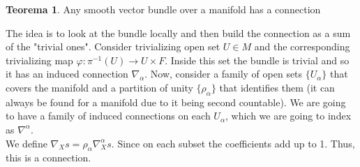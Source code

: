 \documentclass[12pt,a4paper]{report}
\theoremstyle{definition}
\theoremstyle{Theorem}
\newtheorem{Theo}[Def]{Teorema}
\theoremstyle{definition}
\theoremstyle{definition}
\theoremstyle{definition}
\begin{document}
	\begin{Theo}
		Any smooth vector bundle over a manifold has a connection
	\end{Theo}
	The idea is to look at the bundle locally and then build the connection as a sum of the "trivial ones". Consider trivializing open set $U\in M$ and the corresponding trivializing map $\varphi:\pi^{-1}(U)\rightarrow U\times F$. Inside this set the bundle is trivial and so it has an induced connection $\nabla_\alpha$. Now, consider a family of open sets $\{U_\alpha\}$ that covers the manifold and a partition of unity $\{\rho_\alpha\}$ that identifies them (it can always be found for a manifold due to it being second countable). We are going to have a family of induced connections on each $U_\alpha$, which we are going to index as $\nabla^\alpha$.\\
	We define $\nabla_X s=\rho_\alpha\nabla_X^\alpha s$. Since on each subset the coefficients add up to 1. Thus, this is a connection.
\end{document}
